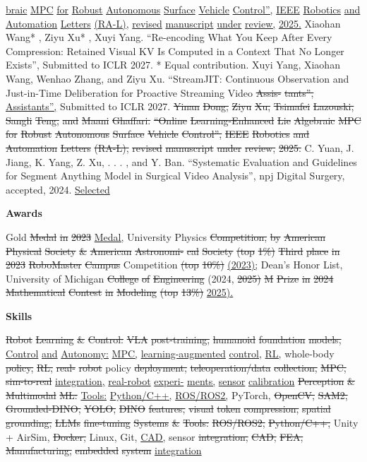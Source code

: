 \documentclass[10pt,letterpaper]{article}
\newcommand{\del}[1]{{\color{red}\sout{#1}}}
\newcommand{\add}[1]{{\color{blue}\uline{#1}}}
\begin{document}
\add{braic} \add{MPC} \add{for} \add{Robust} \add{Autonomous} \add{Surface} \add{Vehicle} \add{Control'',} \add{IEEE} \add{Robotics} \add{and} \add{Automation} \add{Letters} \add{(RA-L),} \add{revised} \add{manuscript} \add{under} \add{review,} \add{2025.}  Xiaohan Wang* , Ziyu Xu* , Xuyi Yang. ``Re-encoding What You Keep After Every Compression: Retained Visual KV Is Computed in a Context That No Longer Exists'', Submitted to ICLR 2027. * Equal contribution.  Xuyi Yang, Xiaohan Wang, Wenhao Zhang, and Ziyu Xu. ``StreamJIT: Continuous Observation and Just-in-Time Deliberation for Proactive Streaming Video \del{Assis-} \del{tants'',} \add{Assistants'',} Submitted to ICLR 2027. \del{} \del{Yinan} \del{Dong,} \del{Ziyu} \del{Xu,} \del{Tsimafei} \del{Lazouski,} \del{Sangli} \del{Teng,} \del{and} \del{Maani} \del{Ghaffari.} \del{``Online} \del{Learning-Enhanced} \del{Lie} \del{Algebraic} \del{MPC} \del{for} \del{Robust} \del{Autonomous} \del{Surface} \del{Vehicle} \del{Control'',} \del{IEEE} \del{Robotics} \del{and} \del{Automation} \del{Letters} \del{(RA-L),} \del{revised} \del{manuscript} \del{under} \del{review,} \del{2025.}  C. Yuan, J. Jiang, K. Yang, Z. Xu, . . . , and Y. Ban. ``Systematic Evaluation and Guidelines for Segment Anything Model in Surgical Video Analysis'', npj Digital Surgery, accepted, 2024. \add{Selected} \par\medskip\textbf{Awards}\par  \del{} Gold \del{Medal} \del{in} \del{2023} \add{Medal,} University Physics \del{Competition,} \del{by} \del{American} \del{Physical} \del{Society} \del{\&} \del{American} \del{Astronomi-} \del{cal} \del{Society} \del{(top} \del{1\%)} \del{} \del{Third} \del{place} \del{in} \del{2023} \del{RoboMaster} \del{Campus} Competition \del{(top} \del{10\%)} \del{} \add{(2023);} Dean's Honor List, University of Michigan \del{College} \del{of} \del{Engineering} (2024, \del{2025)} \del{} \del{M} \del{Prize} \del{in} \del{2024} \del{Mathematical} \del{Contest} \del{in} \del{Modeling} \del{(top} \del{13\%)} \add{2025).} \par\medskip\textbf{Skills}\par   \del{Robot} \del{Learning} \del{\&} \del{Control:} \del{VLA} \del{post-training,} \del{humanoid} \del{foundation} \del{models,} \add{Control} \add{and} \add{Autonomy:} \add{MPC,} \add{learning-augmented} \add{control,} \add{RL,} whole-body \del{policy,} \del{RL,} \del{real-} \del{robot} policy \del{deployment,} \del{teleoperation/data} \del{collection,} \del{MPC,} \del{sim-to-real} \add{integration,} \add{real-robot} \add{experi-} \add{ments,} \add{sensor} \add{calibration}  \del{Perception} \del{\&} \del{Multimodal} \del{ML:} \add{Tools:} \add{Python/C++,} \add{ROS/ROS2,} PyTorch, \del{OpenCV,} \del{SAM2,} \del{Grounded-DINO,} \del{YOLO,} \del{DINO} \del{features,} \del{visual} \del{token} \del{compression,} \del{spatial} \del{grounding,} \del{LLMs} \del{fine-tuning} \del{} \del{Systems} \del{\&} \del{Tools:} \del{ROS/ROS2,} \del{Python/C++,} Unity + AirSim, \del{Docker,} Linux, Git, \add{CAD,} sensor \del{integration,} \del{CAD,} \del{FEA,} \del{Manufacturing,} \del{embedded} \del{system} \add{integration}\end{document}
\end{document}

